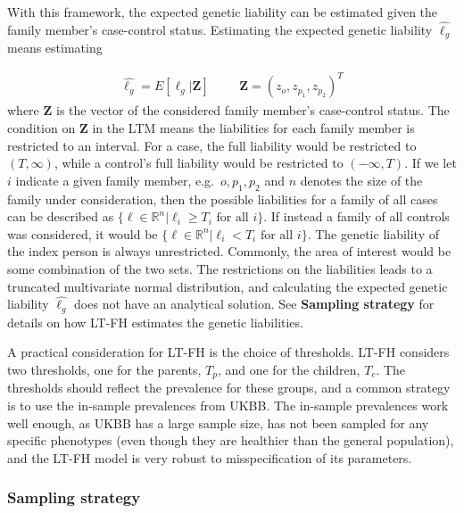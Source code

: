 With this framework, the expected genetic liability can be estimated given the family member's case-control status. Estimating the expected genetic liability $ \hat{\ell_g} $ means estimating 

\begin{align*}
\hat{\ell_g} = E\left[ \ell_g | \mathbf{Z} \right] & & & \mathbf{Z} = \left(z_o, z_{p_1}, z_{p_2} \right)^T
\end{align*}
where $ \mathbf{Z} $ is the vector of the considered family member's case-control status. The condition on $ \mathbf{Z} $ in the LTM means the liabilities for each family member is restricted to an interval. For a case, the full liability would be restricted to $ (T, \infty) $, while a control's full liability would be restricted to $ (-\infty, T) $. If we let $ i $ indicate a given family member, e.g.\ $ o, p_1, p_2 $ and $ n $ denotes the size of the family under consideration, then the possible liabilities for a family of all cases can be described as $ \{ \ell \in \mathbb{R}^n | \ell_i \geq T_i \text{ for all } i\} $. If instead a family of all controls was considered, it would be $ \{ \ell \in \mathbb{R}^n | \ell_i < T_i \text{ for all } i\} $. The genetic liability of the index person is always unrestricted. Commonly, the area of interest would be some combination of the two sets. The restrictions on the liabilities leads to a truncated multivariate normal distribution, and calculating the expected genetic liability $ \hat{\ell_g} $ does not have an analytical solution. See \textbf{Sampling strategy} for details on how LT-FH estimates the genetic liabilities. 

A practical consideration for LT-FH is the choice of thresholds. LT-FH considers two thresholds, one for the parents, $ T_p $, and one for the children, $ T_c $. The thresholds should reflect the prevalence for these groups, and a common strategy is to use the in-sample prevalences from UKBB. The in-sample prevalences work well enough, as UKBB has a large sample size, has not been sampled for any specific phenotypes (even though they are healthier than the general population), and the LT-FH model is very robust to misspecification of its parameters.

\subsubsection{Sampling strategy}

